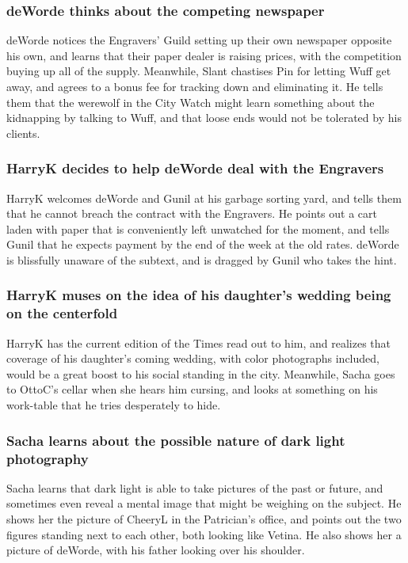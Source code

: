 \subsubsection{\Gls{deWorde} thinks about the competing newspaper}
\Gls{deWorde} notices the Engravers' Guild setting up their own newspaper opposite his own, and
learns that their paper dealer is raising prices, with the competition buying up all of the
supply. Meanwhile, \Gls{Slant} chastises \Gls{Pin} for letting \Gls{Wuff} get away, and agrees to
a bonus fee for tracking down and eliminating it. He tells them that the werewolf in the City
Watch might learn something about the kidnapping by talking to \Gls{Wuff}, and that loose ends would
not be tolerated by his clients.

\subsubsection{\Gls{HarryK} decides to help \Gls{deWorde} deal with the Engravers}
\Gls{HarryK} welcomes \Gls{deWorde} and \Gls{Gunil} at his garbage sorting yard, and tells them that
he cannot breach the contract with the Engravers. He points out a cart laden with paper that is
conveniently left unwatched for the moment, and tells \Gls{Gunil} that he expects payment by the
end of the week at the old rates. \Gls{deWorde} is blissfully unaware of the subtext, and is dragged
by \Gls{Gunil} who takes the hint.

\subsubsection{\Gls{HarryK} muses on the idea of his daughter's wedding being on the centerfold}
\Gls{HarryK} has the current edition of the Times read out to him, and realizes that coverage of his
daughter's coming wedding, with color photographs included, would be a great boost to his social
standing in the city. Meanwhile, \Gls{Sacha} goes to \Gls{OttoC}'s cellar when she hears him
cursing, and looks at something on his work-table that he tries desperately to hide.

\subsubsection{\Gls{Sacha} learns about the possible nature of dark light photography}
\Gls{Sacha} learns that dark light is able to take pictures of the past or future, and sometimes
even reveal a mental image that might be weighing on the subject. He shows her the picture of
\Gls{CheeryL} in the Patrician's office, and points out the two figures standing next to each other,
both looking like \Gls{Vetina}. He also shows her a picture of \Gls{deWorde}, with his father
looking over his shoulder.

